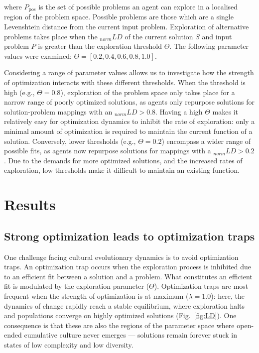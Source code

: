 \documentclass{article}
\begin{document}
where $P_{\text{pos}}$ is the set of possible problems an agent can explore in a localised region of the problem space. Possible problems are those which are a single Levenshtein distance from the current input problem. Exploration of alternative problems takes place when the $_{norm}LD$ of the current solution $S$ and input problem $P$ is greater than the exploration threshold $\Theta$. The following parameter values were examined: $\Theta=[0.2,0.4,0.6,0.8,1.0]$. 

Considering a range of parameter values allows us to investigate how the strength of optimization interacts with these different thresholds. When the threshold is high (e.g., $\Theta=0.8$), exploration of the problem space only takes place for a narrow range of poorly optimized solutions, as agents only repurpose solutions for solution-problem mappings with an $_{norm}LD>0.8$. Having a high $\Theta$ makes it relatively easy for optimization dynamics to inhibit the rate of exploration: only a minimal amount of optimization is required to maintain the current function of a solution. Conversely, lower thresholds (e.g., $\Theta=0.2$) encompass a wider range of possible fits, as agents now repurpose solutions for mappings with a $_{norm}LD>0.2$. Due to the demands for more optimized solutions, and the increased rates of exploration, low thresholds make it difficult to maintain an existing function.

\section{Results}
\subsection{Strong optimization leads to optimization traps}
One challenge facing cultural evolutionary dynamics is to avoid optimization traps. An optimization trap occurs when the exploration process is inhibited due to an efficient fit between a solution and a problem. What constitutes an efficient fit is modulated by the exploration parameter ($\Theta$). Optimization traps are most frequent when the strength of optimization is at maximum ($\lambda=1.0$): here, the dynamics of change rapidly reach a stable equilibrium, where exploration halts and populations converge on highly optimized solutions (Fig.~\ref{fig:LD}). One consequence is that these are also the regions of the parameter space where open-ended cumulative culture never emerges --- solutions remain forever stuck in states of low complexity and low diversity.
\end{document}
